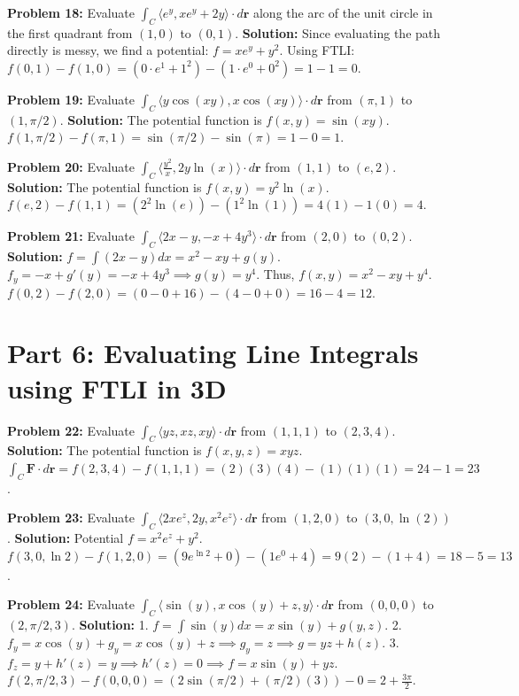 \documentclass[12pt]{article}
\begin{document}
\textbf{Problem 18:} Evaluate $\int_C \langle e^y, x e^y + 2y \rangle \cdot d\mathbf{r}$ along the arc of the unit circle in the first quadrant from $(1,0)$ to $(0,1)$.
\textbf{Solution:} Since evaluating the path directly is messy, we find a potential: $f = x e^y + y^2$.
Using FTLI: $f(0,1) - f(1,0) = (0 \cdot e^1 + 1^2) - (1 \cdot e^0 + 0^2) = 1 - 1 = 0$.

\textbf{Problem 19:} Evaluate $\int_C \langle y \cos(xy), x \cos(xy) \rangle \cdot d\mathbf{r}$ from $(\pi, 1)$ to $(1, \pi/2)$.
\textbf{Solution:} The potential function is $f(x,y) = \sin(xy)$. 
$f(1, \pi/2) - f(\pi, 1) = \sin(\pi/2) - \sin(\pi) = 1 - 0 = 1$.

\textbf{Problem 20:} Evaluate $\int_C \langle \frac{y^2}{x}, 2y \ln(x) \rangle \cdot d\mathbf{r}$ from $(1, 1)$ to $(e, 2)$.
\textbf{Solution:} The potential function is $f(x,y) = y^2 \ln(x)$. 
$f(e, 2) - f(1, 1) = (2^2 \ln(e)) - (1^2 \ln(1)) = 4(1) - 1(0) = 4$.

\textbf{Problem 21:} Evaluate $\int_C \langle 2x - y, -x + 4y^3 \rangle \cdot d\mathbf{r}$ from $(2, 0)$ to $(0, 2)$.
\textbf{Solution:} $f = \int(2x-y)dx = x^2 - xy + g(y)$. 
$f_y = -x + g'(y) = -x + 4y^3 \implies g(y) = y^4$. Thus, $f(x,y) = x^2 - xy + y^4$.
$f(0, 2) - f(2, 0) = (0 - 0 + 16) - (4 - 0 + 0) = 16 - 4 = 12$.

\section*{Part 6: Evaluating Line Integrals using FTLI in 3D}

\textbf{Problem 22:} Evaluate $\int_C \langle yz, xz, xy \rangle \cdot d\mathbf{r}$ from $(1, 1, 1)$ to $(2, 3, 4)$.
\textbf{Solution:} The potential function is $f(x,y,z) = xyz$. 
$\int_C \mathbf{F} \cdot d\mathbf{r} = f(2,3,4) - f(1,1,1) = (2)(3)(4) - (1)(1)(1) = 24 - 1 = 23$.

\textbf{Problem 23:} Evaluate $\int_C \langle 2x e^z, 2y, x^2 e^z \rangle \cdot d\mathbf{r}$ from $(1, 2, 0)$ to $(3, 0, \ln(2))$.
\textbf{Solution:} 
Potential $f = x^2 e^z + y^2$. 
$f(3, 0, \ln 2) - f(1, 2, 0) = \left(9 e^{\ln 2} + 0\right) - \left(1 e^0 + 4\right) = 9(2) - (1 + 4) = 18 - 5 = 13$.

\textbf{Problem 24:} Evaluate $\int_C \langle \sin(y), x \cos(y) + z, y \rangle \cdot d\mathbf{r}$ from $(0, 0, 0)$ to $(2, \pi/2, 3)$.
\textbf{Solution:} 
1. $f = \int \sin(y) dx = x \sin(y) + g(y,z)$.
2. $f_y = x \cos(y) + g_y = x \cos(y) + z \implies g_y = z \implies g = yz + h(z)$.
3. $f_z = y + h'(z) = y \implies h'(z)=0 \implies f = x \sin(y) + yz$.
$f(2, \pi/2, 3) - f(0,0,0) = \left(2\sin(\pi/2) + (\pi/2)(3)\right) - 0 = 2 + \frac{3\pi}{2}$.
\end{document}
